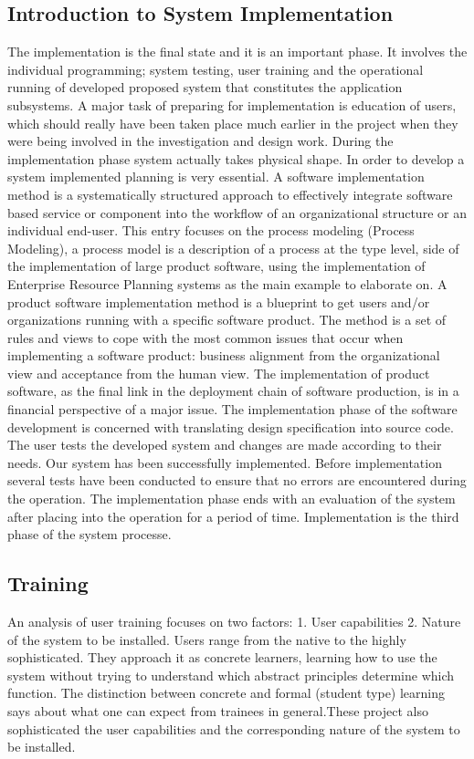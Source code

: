 \documentclass[a4paper,12pt]{article}
\begin{document}
\subsection{Introduction to System Implementation}
The implementation is the final state and it is an important phase. It involves the individual programming; system testing, user training and the operational running of developed proposed system that constitutes the application subsystems. A major task of preparing for implementation is education of users, which should really have been taken place much earlier in the project when they were being involved in the investigation and design work. During the implementation phase system actually takes physical shape. In order to develop a system implemented planning is very essential. 
A software implementation method is a systematically structured approach to effectively integrate software based service or component into the workflow of an organizational structure or an individual end-user. This entry focuses on the process modeling (Process Modeling), a process model is a description of a process at the type level, side of the implementation of large product software, using the implementation of Enterprise Resource Planning systems as the main example to elaborate on. A product software implementation method is a blueprint to get users and/or organizations running with a specific software product. The method is a set of rules and views to cope with the most common issues that occur when implementing a software product: business alignment from the organizational view and acceptance from the human view. The implementation of product software, as the final link in the deployment chain of software production, is in a financial perspective of a major issue.
The implementation phase of the software development is concerned with translating design specification into source code. The user tests the developed system and changes are made according to their needs. Our system has been successfully implemented. Before implementation several tests have been conducted to ensure that no errors are encountered during the operation. The implementation phase ends with an evaluation of the system after placing into the operation for a period of time. Implementation is the third phase of the system processe. 
\newpage
\subsection{Training}
An analysis of user training focuses on two factors:
1.	User capabilities
2.	 Nature of the system to be installed.
Users range from the native to the highly sophisticated. They approach it as concrete learners, learning how to use the system without trying to understand which abstract principles determine which function. The distinction between concrete and formal (student type) learning says about what one can expect from trainees in general.These project also sophisticated the user capabilities and the corresponding nature of the system to be installed.
\newpage  
\end{document}
